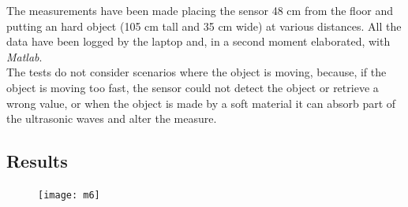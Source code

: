 The measurements have been made placing the sensor 48 cm from the floor and putting an hard object (105 cm tall and 35 cm wide) at various distances. All the data have been logged by the laptop and, in a second moment elaborated, with \textit{Matlab}.\\
The tests do not consider scenarios where the object is moving, because, if the object is moving too fast, the sensor could not detect the object or retrieve a wrong value, or when the object is made by a soft material it can absorb part of the ultrasonic waves and alter the measure. 


\subsection{Results}
\begin{figure}[H]
\texttt{[image: m6]}
\end{figure}


